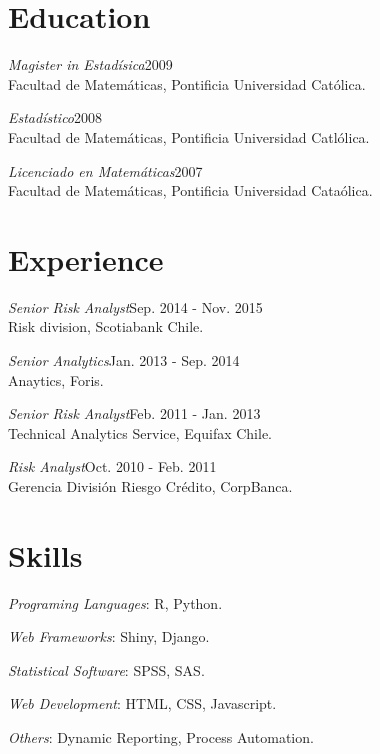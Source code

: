 \documentclass[margin]{res}
\begin{document}
\begin{resume}

\section{Education}

    {\sl Magister in Estadísica}\hfill 2009\\
    Facultad de Matemáticas, Pontificia Universidad Católica.

    {\sl Estadístico}\hfill 2008\\
    Facultad de Matemáticas, Pontificia Universidad Catlólica.

    {\sl Licenciado en Matemáticas}\hfill 2007\\
    Facultad de Matemáticas, Pontificia Universidad Cataólica.

\vspace{1cm}

\section{Experience}

    {\sl Senior Risk Analyst}\hfill Sep. 2014 - Nov. 2015\\
        Risk division, Scotiabank Chile.

    {\sl Senior Analytics}\hfill Jan. 2013 - Sep. 2014\\
    Anaytics, Foris.

    {\sl Senior Risk Analyst}\hfill Feb. 2011 - Jan. 2013\\
    Technical Analytics Service, Equifax Chile.

    {\sl Risk Analyst}\hfill Oct. 2010 - Feb. 2011\\
    Gerencia División Riesgo Crédito, CorpBanca.

\vspace{1cm}

\section{Skills}

    {\sl Programing Languages}: R, Python.

    {\sl Web Frameworks}: Shiny, Django.

    {\sl Statistical Software}: SPSS, SAS.
    
    {\sl Web Development}: HTML, CSS, Javascript.
    
    {\sl Others}: Dynamic Reporting, Process Automation.


\end{resume}
\end{document}
